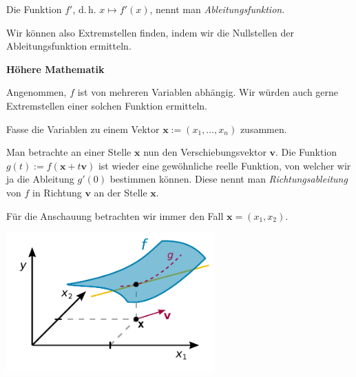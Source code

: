 \documentclass{beamer}
\newcommand{\strong}[1]{\textsf{\textbf{#1}}}
\begin{document}
\begin{frame}
Die Funktion $f'$, d.\,h. $x\mapsto f'(x)$, nennt man
\emph{Ableitungsfunktion}.
\pause

\vspace{0.8em}
Wir können also Extremstellen finden, indem wir die Nullstellen
der Ableitungsfunktion ermitteln.
\end{frame}

\begin{frame}
\begin{center}
\strong{Höhere Mathematik}
\end{center}
\end{frame}

\begin{frame}
Angenommen, $f$ ist von mehreren Variablen abhängig. Wir würden
auch gerne Extremstellen einer solchen Funktion ermitteln.
\end{frame}

\begin{frame}
Fasse die Variablen zu einem Vektor
$\mathbf x:=(x_1,\ldots,x_n)$
zusammen.\pause

\vspace{0.8em}
Man betrachte an einer Stelle $\mathbf x$ nun den Verschiebungsvektor
$\mathbf v$. Die Funktion $g(t):=f(\mathbf x+t\mathbf v)$ ist wieder
eine gewöhnliche reelle Funktion, von welcher wir ja die Ableitung
$g'(0)$ bestimmen können. Diese nennt man \emph{Richtungsableitung}
von $f$ in Richtung $\mathbf v$ an der Stelle $\mathbf x$.
\end{frame}

\begin{frame}[t]
\vspace{2em}
Für die Anschauung betrachten wir immer den Fall
$\mathbf x = (x_1,x_2)$.
\pause

\vspace{-1em}
\begin{center}
\includegraphics[width=80mm]{img/Richtungsableitung.pdf}
\end{center}
\end{frame}
\end{document}
